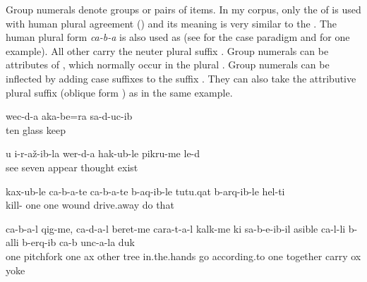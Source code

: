 Group numerals denote groups or pairs of items. In my corpus, only the  of   is used with human plural agreement () and its meaning is very similar to the  . The human plural form \textit{ca-b-a} is also used as  (see  for the case paradigm and   for one example). All other  carry the neuter plural suffix  . Group numerals can be attributes of , which normally occur in the plural . Group numerals can be inflected by adding case suffixes to the suffix  . They can also take the attributive plural suffix  (oblique form ) as in the same example.

\ea\label{ex:thedoctortriedtenpairsofglasses}
\gll	wec{\ej}-d-a	{\eppl}a{\pha}{\paaf}k{\lmk}a-be=ra	sa-d-uc-ib\\
	ten	glass	keep\\
\glt	{}
\z

\ea\label{ex:afterIsawyoumanythoughtsarose}
\gll	u	{\paaf}i-r-až-ib-la\parn{,}	wer-d-a	hak{\ej}-ub-le	pikru-me	le-d\\
		see	seven	appear	thought	exist\\
\glt	{}
\z

\ea\label{ex:killingsomewoundingothers}
\gll	kax-ub-le	ca-b-a-te	ca-b-a-te	b-a{\pha}q-ib-le	t{\ej}ut{\ej}u.q{\ej}a{\pha}t{\ej}	b-arq{\ej}-ib-le	hel-t{\lmk}i\\
	kill-	one		one 	wound		drive.away	do	that\\
\glt	{}
\z

\ea\label{ex:somepeopletookpitchforks}
\gll	ca-b-a-l	q{\ej}ig-me,	ca-d-a-l	beret-me	cara-t-a-l	k{\lmk}alk-me	k{\lab}i	sa-b-e{\vuvfr}-ib-il	{\phfr}a{\pha}sible	ca-l-li	b-alli	b-erq{\lmk}-ib	ca-b	unc-a-la	duk{\ej}\\
	one	pitchfork	one	ax	other	tree	in.the.hands	go	according.to	one	\tsc{n-}together	carry		ox	yoke\\
\glt	{}
\z



